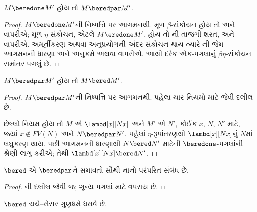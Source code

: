 \begin{lem}
  $M \beredone M'$ હોય તો $M \beredpar M'$.
\end{lem}

\begin{proof}
  $M \beredone M'$ની નિષ્પત્તિ પર આગમનથી.
  મૂળ $\beta$-સંકોચન હોય તો
   અને
   વાપરીએ; મૂળ
  $\eta$-સંકોચન, એટલે $M \eredone M'$, હોય તો
  ની તાજગી-શરત,
   અને
   વાપરીએ.
  અમૂર્તીકરણ અથવા અનુપ્રયોગની અંદર સંકોચન
  થાય ત્યારે ની જેમ
  આગમનની ધારણા અને અનુક્રમે
   અથવા
   વાપરીએ.
  આથી દરેક એક-પગલાનું $\beta\eta$-સંકોચન
  સમાંતર પગલું છે.
\end{proof}

\begin{lem}
  $M \beredpar M'$ હોય તો $M \bered M'$.
\end{lem}

\begin{proof}
  $M \beredpar M'$ની નિષ્પત્તિ પર આગમનથી.
  પહેલા ચાર નિયમો માટે
   જેવી દલીલ છે.

  છેલ્લો નિયમ  હોય તો
  $M$ એ $\lambd[x][Nx]$ અને $M'$ એ $N'$, કોઈક
  $x$, $N$, $N'$ માટે, જ્યાં
  $x \notin FV(N)$ અને $N \beredpar N'$.
  પહેલાં $\eta$-રૂપાંતરણથી
  $\lambd[x][Nx]$નું $N$માં લઘુકરણ થાય.
  પછી આગમનની ધારણાથી $N \bered N'$ માટેની
  $\beredone$-પગલાંની શ્રેણી લાગુ કરીએ;
  તેથી $\lambd[x][Nx] \bered N'$.
\end{proof}

\begin{lem}
  $\bered$ એ $\beredpar$ને સમાવતો સૌથી નાનો
  પરંપરિત સંબંધ છે.
\end{lem}

\begin{proof}
  ની દલીલ જેવી જ; શૂન્ય પગલાં
  માટે  વપરાય છે.
\end{proof}

\begin{thm}
  $\bered$ ચર્ચ--રોસર ગુણધર્મ ધરાવે છે.
\end{thm}

